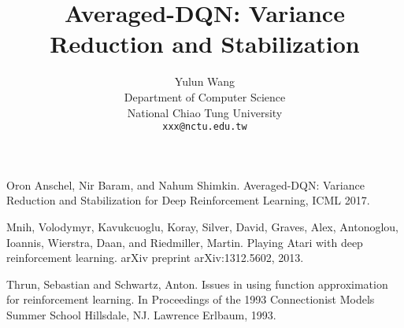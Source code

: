 \documentclass{article}
\title{Averaged-DQN: Variance Reduction and Stabilization}
\author{%
  Yulun Wang\\
  Department of Computer Science\\
  National Chiao Tung University\\
  \texttt{xxx@nctu.edu.tw} \\

}
\begin{document}
\maketitle









{
\small

\begin{thebibliography}{9}
Oron Anschel, Nir Baram, and Nahum Shimkin.
Averaged-DQN: Variance Reduction and Stabilization for Deep Reinforcement Learning, ICML 2017.

Mnih, Volodymyr, Kavukcuoglu, Koray, Silver, David,
Graves, Alex, Antonoglou, Ioannis, Wierstra, Daan, and
Riedmiller, Martin.
Playing Atari with deep reinforcement learning. arXiv preprint arXiv:1312.5602, 2013.

Thrun, Sebastian and Schwartz, Anton.
Issues in using
function approximation for reinforcement learning. In
Proceedings of the 1993 Connectionist Models Summer
School Hillsdale, NJ. Lawrence Erlbaum, 1993.
\end{thebibliography}
}
\end{document}

